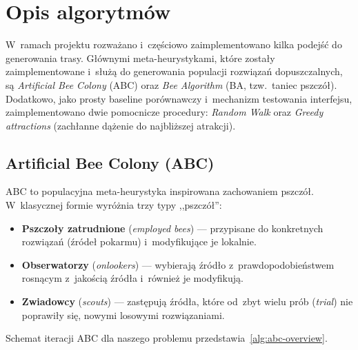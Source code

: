 \section{Opis algorytmów}
\label{sec:algorytmy}

W~ramach projektu rozważano i~częściowo zaimplementowano kilka podejść do
generowania trasy. Głównymi meta-heurystykami, które zostały zaimplementowane
i~służą do generowania populacji rozwiązań dopuszczalnych, są \emph{Artificial
Bee Colony} (ABC) oraz \emph{Bee Algorithm} (BA, tzw.\ taniec pszczół). Dodatkowo,
jako prosty baseline porównawczy i~mechanizm testowania interfejsu,
zaimplementowano dwie pomocnicze procedury:
\emph{Random Walk} oraz \emph{Greedy attractions} (zachłanne dążenie do najbliższej
atrakcji).

\subsection{Artificial Bee Colony (ABC)}
\label{sec:abc}

ABC to populacyjna meta-heurystyka inspirowana zachowaniem pszczół. W~klasycznej
formie wyróżnia trzy typy ,,pszczół'':
\begin{itemize}
    \item \textbf{Pszczoły zatrudnione} (\emph{employed bees}) --- przypisane
          do konkretnych rozwiązań (źródeł pokarmu) i~modyfikujące je lokalnie.
    \item \textbf{Obserwatorzy} (\emph{onlookers}) --- wybierają źródło
          z~prawdopodobieństwem rosnącym z~jakością źródła i~również je modyfikują.
    \item \textbf{Zwiadowcy} (\emph{scouts}) --- zastępują źródła, które od~zbyt
          wielu prób (\emph{trial}) nie poprawiły się, nowymi losowymi rozwiązaniami.
\end{itemize}

Schemat iteracji ABC dla naszego problemu przedstawia~\cref{alg:abc-overview}.

